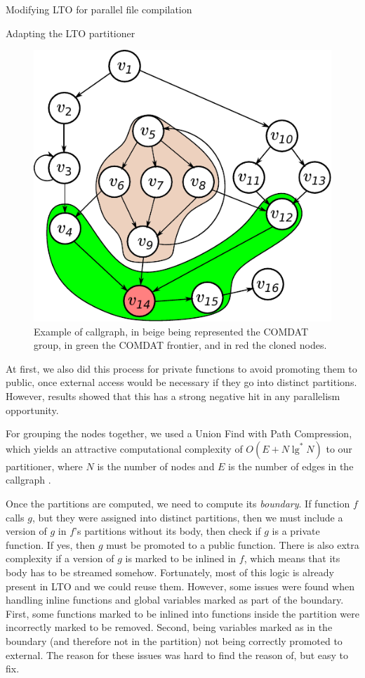\begin{section}{Modifying LTO for parallel file compilation}
\begin{subsection}{Adapting the LTO partitioner}
\begin{figure}
\centering
	 \includegraphics[scale=0.7]{figuras/comdat_frontier.pdf}
	  \caption{Example of callgraph, in beige being represented the COMDAT group,
	  in green the COMDAT frontier, and in red the cloned nodes.}
	  \label{fig:comdat_frontier}
\end{figure}

At first, we also did this process for private functions to avoid
promoting them to public, once external access would be necessary if they go
into distinct partitions. However, results showed that this has a strong
negative hit in any parallelism opportunity.

For grouping the nodes together,
we used a Union Find with Path Compression, which yields an attractive
computational complexity of $O(E + N \lg^*N)$ to our partitioner, where $N$ is the
number of nodes and $E$ is the number of edges in the callgraph \cite{feufiloff}.

Once the partitions are computed, we need to compute its \textit{boundary}.
If function $f$ calls $g$, but they were assigned into distinct partitions,
then we must include a version of $g$ in $f$'s partitions without its body,
then check if $g$ is a private function. If yes, then $g$ must be promoted
to a public function. There is also extra complexity if a version of $g$
is marked to be inlined in $f$, which means that its body has to be
streamed somehow. Fortunately, most of this logic is already present
in LTO and we could reuse them. However, some issues were found
when handling inline functions and global variables marked as part
of the boundary. First, some functions marked to be inlined into 
functions inside the partition were incorrectly marked to be removed.
Second, being variables marked as in the boundary (and therefore
not in the partition) not being correctly promoted to external. The reason
for these issues was hard to find the reason of, but easy to fix.


\end{subsection}
\end{section}

